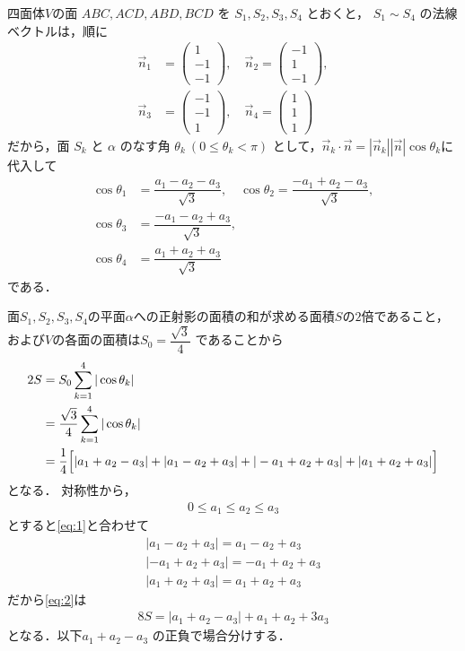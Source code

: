 \documentclass[../../main.tex]{subfiles}
\begin{document}
四面体$V$の面 $ABC, ACD, ABD, BCD$ を $S_1, S_2, S_3, S_4$ とおくと，
$S_1 \sim S_4$ の法線ベクトルは，順に
\begin{align}
  \vec{n}_1 &=
  \begin{pmatrix} 1 \\ -1 \\ -1
  \end{pmatrix}, \quad
  \vec{n}_2 =
  \begin{pmatrix} -1 \\ 1 \\ -1
  \end{pmatrix}, \\
  \vec{n}_3 &=
  \begin{pmatrix} -1 \\ -1 \\ 1
  \end{pmatrix}, \quad
  \vec{n}_4 =
  \begin{pmatrix} 1 \\ 1 \\ 1
  \end{pmatrix}
\end{align}
だから，面 $S_k$ と $\alpha$ のなす角 $\theta_k \ (0 \le \theta_k < \pi)$ として，$\vec{n}_{k}\cdot \vec{n}=|\vec{n}_{k}||\vec{n}|\cos\theta_k$に代入して
\begin{align}
  \cos\theta_1 &= \dfrac{a_1-a_2-a_3}{\sqrt{3}}, \quad \cos\theta_2 = \dfrac{-a_1+a_2-a_3}{\sqrt{3}}, \\
  \cos\theta_3 &= \dfrac{-a_1-a_2+a_3}{\sqrt{3}}, \\
  \cos\theta_4 &= \dfrac{a_1+a_2+a_3}{\sqrt{3}}
\end{align}
である．

面$S_1,S_2,S_3,S_4$の平面$\alpha$への正射影の面積の和が求める面積$S$の$2$倍であること，および$V$の各面の面積は$S_0=\dfrac{\sqrt{3}}{4}$ であることから
\begin{align}
  2S
  &= S_0 \sum_{k=1}^4 |\cos\theta_k| \\
  &= \dfrac{\sqrt{3}}{4} \sum_{k=1}^4 |\cos\theta_k| \\
  &= \dfrac{1}{4} \Bigl[ |a_1+a_2-a_3| + |a_1-a_2+a_3| + |-a_1+a_2+a_3| + |a_1+a_2+a_3| \Bigr] \label{eq:2}
\end{align}
となる．
対称性から，
\begin{align}
  0 \le a_1 \le a_2 \le a_3 \label{eq:3}
\end{align}
とすると\cref{eq:1}と合わせて
\begin{align}
  |a_1-a_2+a_3|  = a_1-a_2+a_3 \\
  |-a_1+a_2+a_3| = -a_1+a_2+a_3 \\
  |a_1+a_2+a_3|  = a_1+a_2+a_3
\end{align}
だから\cref{eq:2}は
\begin{align}
  8S = |a_1+a_2-a_3| + a_1+a_2+3a_3 \label{eq:4}
\end{align}
となる．以下$a_1+a_2-a_3$ の正負で場合分けする．
\end{document}
